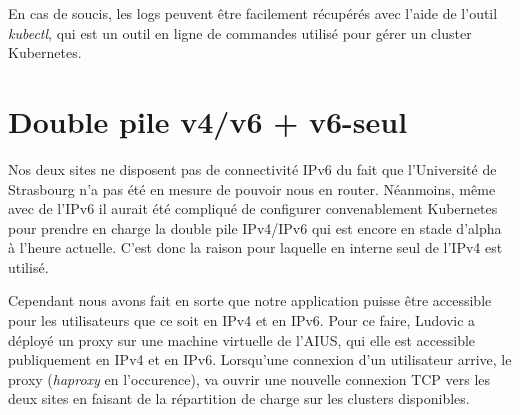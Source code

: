 En cas de soucis, les logs peuvent être facilement récupérés avec l'aide
de l'outil \textit{kubectl}, qui est un outil en ligne de commandes
utilisé pour gérer un cluster Kubernetes.

\section{Double pile v4/v6 + v6-seul}

Nos deux sites ne disposent pas de connectivité IPv6 du fait que
l'Université de Strasbourg n'a pas été en mesure de pouvoir nous en
router. Néanmoins, même avec de l'IPv6 il aurait été compliqué de
configurer convenablement Kubernetes pour prendre en charge la double
pile IPv4/IPv6 qui est encore en stade d'alpha à l'heure actuelle. C'est
donc la raison pour laquelle en interne seul de l'IPv4 est utilisé.

Cependant nous avons fait en sorte que notre application puisse être
accessible pour les utilisateurs que ce soit en IPv4 et en IPv6. Pour ce
faire, Ludovic a déployé un proxy sur une machine virtuelle de l'AIUS,
qui elle est accessible publiquement en IPv4 et en IPv6. Lorsqu'une
connexion d'un utilisateur arrive, le proxy (\textit{haproxy} en
l'occurence), va ouvrir une nouvelle connexion TCP vers les deux sites
en faisant de la répartition de charge sur les clusters disponibles.
